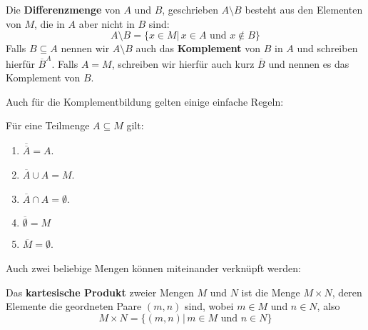\medbreak

\begin{definition} Die \textbf{Differenzmenge} von $A$ und $B$, geschrieben $A \setminus B$ 
besteht aus den Elementen von $M$, die in $A$ aber nicht in $B$ sind:
  $$ A \setminus B = \{ x \in M \vert \, x \in A \textrm{ und } x \notin B \} $$
Falls $B \subseteq A$ nennen wir $A \setminus B$ auch das \textbf{Komplement} von $B$ in $A$ 
und schreiben 
hierfür $\overline{B}^A$. Falls $A = M$, schreiben wir hierfür auch kurz $\overline{B}$ 
und nennen es das Komplement von $B$. 
\end{definition}

	\begin{figure}[H]
	\vspace{-0.4cm}
		\begin{center}
		\begin{scaletikzpicturetowidth}{0.55\textwidth}
     			 
		\end{scaletikzpicturetowidth}
		\end{center}
	\vspace{-0.8cm}
	\end{figure}

Auch für die Komplementbildung gelten einige einfache Regeln:

\begin{regel}\label{mengen_regel_komplement} Für eine Teilmenge $A \subseteq M$ gilt:
\begin{enumerate}
\item $\overline{\overline{A}} = A$.
\item $\overline{A} \cup A = M$.
\item $\overline{A} \cap A = \emptyset$.
\item $\overline{\emptyset} = M$
\item $\overline{M} = \emptyset$.
\end{enumerate}
\end{regel}

\bigbreak

Auch zwei beliebige Mengen können miteinander verknüpft werden:

\begin{definition} Das \textbf{kartesische Produkt} zweier Mengen $M$ und $N$ ist 
die Menge $M \times N$, deren Elemente die geordneten Paare $(m, n)$ sind, wobei $m \in M$ und $n \in N$, also
  	$$ M \times N = \{ (m, n) \vert \, m \in M \textrm{ und } n \in  N \} $$
\end{definition}

